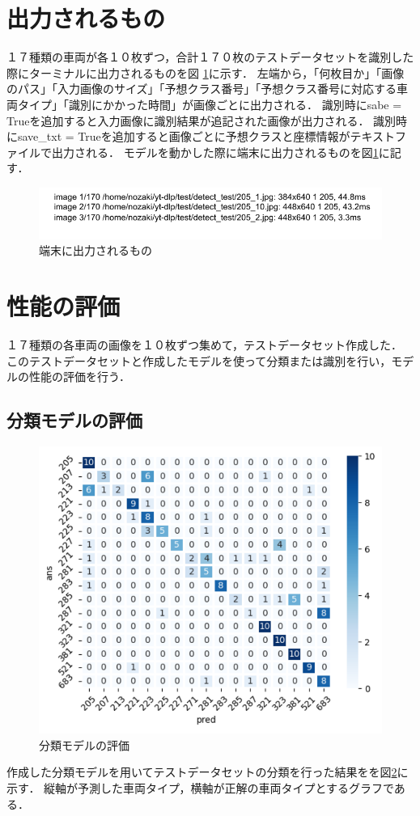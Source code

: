 \section{出力されるもの}
１７種類の車両が各１０枚ずつ，合計１７０枚のテストデータセットを識別した際にターミナルに出力されるものを図 \ref{output}に示す．
左端から，「何枚目か」「画像のパス」「入力画像のサイズ」「予想クラス番号」「予想クラス番号に対応する車両タイプ」「識別にかかった時間」が画像ごとに出力される．
識別時にsabe = Trueを追加すると入力画像に識別結果が追記された画像が出力される．
識別時にsave\_txt = Trueを追加すると画像ごとに予想クラスと座標情報がテキストファイルで出力される．
モデルを動かした際に端末に出力されるものを図\ref{output}に記す．
\begin{figure}	
	\centering
	\includegraphics[width=\linewidth]{fig/a.pdf}
	\caption{端末に出力されるもの}\label{output}
\end{figure}

\section{性能の評価}
１７種類の各車両の画像を１０枚ずつ集めて，テストデータセット作成した．
このテストデータセットと作成したモデルを使って分類または識別を行い，モデルの性能の評価を行う．
\subsection{分類モデルの評価}
\begin{figure}	
	\centering
	\includegraphics[width=\linewidth]{chap4/fig/classify_results.pdf}
	\caption{分類モデルの評価}
	\label{CLS}
\end{figure}
作成した分類モデルを用いてテストデータセットの分類を行った結果をを図\ref{CLS}に示す．
縦軸が予測した車両タイプ，横軸が正解の車両タイプとするグラフである．

